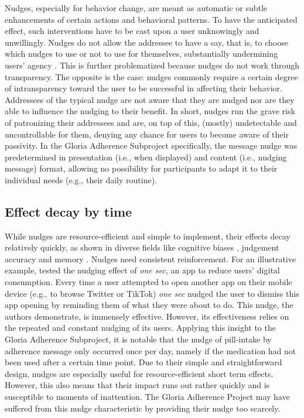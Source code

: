 \documentclass[reflection, authordate]{jote-new-article}
\begin{document}
Nudges, especially for behavior change, are meant as automatic or subtle enhancements of certain actions and behavioral patterns. To have the anticipated effect, such interventions have to be cast upon a user unknowingly and unwillingly. Nudges do not allow the addressee to have a say, that is, to choose which nudges to use or not to use for themselves, substantially undermining users’ agency \parencites[for an extensive discussion][]{Hertwig2020}. This is further problematized because nudges do not work through transparency. The opposite is the case: nudges commonly require a certain degree of intransparency toward the user to be successful in affecting their behavior. Addressees of the typical nudge are not aware that they are nudged nor are they able to influence the nudging to their benefit. In short, nudges run the grave risk of patronizing their addressees and are, on top of this, (mostly) undetectable and uncontrollable for them, denying any chance for users to become aware of their passivity. In the Gloria Adherence Subproject specifically, the message nudge was predetermined in presentation (i.e., when displayed) and content (i.e., nudging message) format, allowing no possibility for participants to adapt it to their individual needs (e.g., their daily routine).



\subsection{Effect decay by time}



While nudges are resource-efficient and simple to implement, their effects decay relatively quickly, as shown in diverse fields like cognitive biases \parencites{Grüning2022}, judgement accuracy \parencites{Lorenz-Spreen2021} and memory \parencites{Trammell1992}. Nudges need consistent reinforcement. For an illustrative example, \textcite{Grüning2022a} tested the nudging effect of \emph{one sec,} an app to reduce users’ digital consumption. Every time a user attempted to open another app on their mobile device (e.g., to browse Twitter or TikTok) \emph{one sec} nudged the user to dismiss this app opening by reminding them of what they were about to do. This nudge, the authors demonstrate, is immensely effective. However, its effectiveness relies on the repeated and constant nudging of its users. Applying this insight to the Gloria Adherence Subproject, it is notable that the nudge of pill-intake by adherence message only occurred once per day, namely if the medication had not been used after a certain time point. Due to their simple and straightforward design, nudges are especially useful for resource-efficient short term effects. However, this also means that their impact runs out rather quickly and is susceptible to moments of inattention. The Gloria Adherence Project may have suffered from this nudge characteristic by providing their nudge too scarcely.
\end{document}
